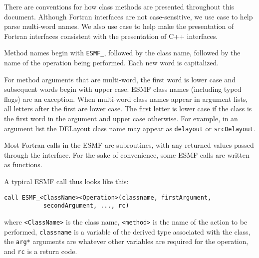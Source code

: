There are conventions for how class methods are presented throughout 
this document.  Although Fortran interfaces are not case-sensitive,
we use case to help parse multi-word names.  We also use case to help
make the presentation of Fortran interfaces consistent with the 
presentation of C++ interfaces.  

Method names begin with {\tt ESMF\_}, followed by the class name, 
followed by the name of the operation being performed.  Each new 
word is capitalized. 

For method arguments that are multi-word, the first word is lower
case and subsequent words begin with upper case.  ESMF class 
names (including typed flags) are an exception.  When multi-word 
class names appear in argument lists, all letters after the first 
are lower case.  The first letter is lower case if the class is the
first word in the argument and upper case otherwise.  For 
example, in an argument list the DELayout class name may appear 
as {\tt delayout} or {\tt srcDelayout}.

Most Fortran calls in the ESMF are subroutines, with 
any returned values passed through the interface.  For the sake of 
convenience, some ESMF calls are written as functions.

A typical ESMF call thus looks like this:

\begin{verbatim}
call ESMF_<ClassName><Operation>(classname, firstArgument, 
           secondArgument, ..., rc)
\end{verbatim}

where \newline
{\tt <ClassName>} is the class name, \newline
{\tt <method>} is the name of the action to be performed, \newline 
{\tt classname} is a variable of the derived type associated 
with the class, \newline
the {\tt arg*} arguments are whatever other variables are required 
for the operation, \newline
and {\tt rc} is a return code. \newline



